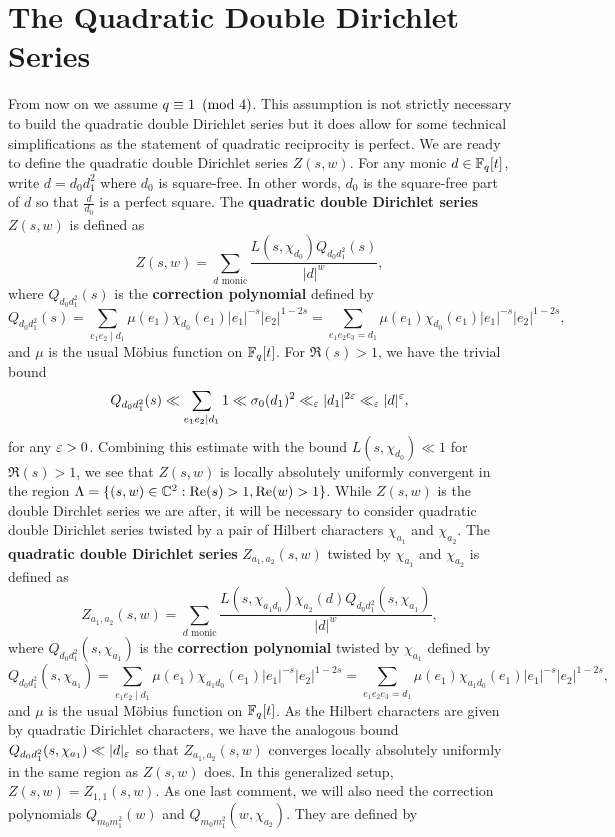 \documentclass[12pt,reqno,oneside]{amsart}
\begin{document}
\section{The Quadratic Double Dirichlet Series}
    From now on we assume $q \equiv 1 \ \left(\text{mod }4\right)$. This assumption is not strictly necessary to build the quadratic double Dirichlet series but it does allow for some technical simplifications as the statement of quadratic reciprocity is perfect. We are ready to define the quadratic double Dirichlet series $Z(s,w)$. For any monic $d \in \mathbb{F}_{q}[t]$, write $d = d_{0}d_{1}^{2}$ where $d_{0}$ is square-free. In other words, $d_{0}$ is the square-free part of $d$ so that $\frac{d}{d_{0}}$ is a perfect square. The \textbf{quadratic double Dirichlet series} $Z(s,w)$ is defined as
    \[
        Z(s,w) = \sum_{\text{$d$ monic}}\frac{L(s,\chi_{d_{0}})Q_{d_{0}d_{1}^{2}}(s)}{|d|^{w}},
    \]
    where $Q_{d_{0}d_{1}^{2}}(s)$ is the \textbf{correction polynomial} defined by
    \[
        Q_{d_{0}d_{1}^{2}}(s) = \sum_{e_{1}e_{2} \mid d_{1}}\mu(e_{1})\chi_{d_{0}}(e_{1})|e_{1}|^{-s}|e_{2}|^{1-2s} = \sum_{e_{1}e_{2}e_{3} = d_{1}}\mu(e_{1})\chi_{d_{0}}(e_{1})|e_{1}|^{-s}|e_{2}|^{1-2s},
    \]
    and $\mu$ is the usual M\"obius function on $\mathbb{F}_{q}[t]$. For $\Re(s) > 1$, we have the trivial bound
    \[
        Q_{d_{0}d_{1}^{2}}(s) \ll \sum_{e_{1}e_{2} \mid d_{1}}1 \ll \sigma_{0}(d_{1})^{2} \ll_{\varepsilon} |d_{1}|^{2\varepsilon} \ll_{\varepsilon} |d|^{\varepsilon},
    \]
    for any $\varepsilon > 0$. Combining this estimate with the bound $L(s,\chi_{d_{0}}) \ll 1$ for $\Re(s) > 1$, we see that $Z(s,w)$ is locally absolutely uniformly convergent in the region $\Lambda = \{(s,w) \in \mathbb{C}^{2}:\mathrm{Re}(s) > 1, \mathrm{Re}(w) > 1\}$. While $Z(s,w)$ is the double Dirchlet series we are after, it will be necessary to consider quadratic double Dirichlet series twisted by a pair of Hilbert characters $\chi_{a_{1}}$ and $\chi_{a_{2}}$. The \textbf{quadratic double Dirichlet series} $Z_{a_{1},a_{2}}(s,w)$ twisted by $\chi_{a_{1}}$ and $\chi_{a_{2}}$ is defined as
    \[
        Z_{a_{1},a_{2}}(s,w) = \sum_{\text{$d$ monic}}\frac{L(s,\chi_{a_{1}d_{0}})\chi_{a_{2}}(d)Q_{d_{0}d_{1}^{2}}(s,\chi_{a_{1}})}{|d|^{w}},
    \]
    where $Q_{d_{0}d_{1}^{2}}(s,\chi_{a_{1}})$ is the \textbf{correction polynomial} twisted by $\chi_{a_{1}}$ defined by
    \[
        Q_{d_{0}d_{1}^{2}}(s,\chi_{a_{1}}) = \sum_{e_{1}e_{2} \mid d_{1}}\mu(e_{1})\chi_{a_{1}d_{0}}(e_{1})|e_{1}|^{-s}|e_{2}|^{1-2s} = \sum_{e_{1}e_{2}e_{3} = d_{1}}\mu(e_{1})\chi_{a_{1}d_{0}}(e_{1})|e_{1}|^{-s}|e_{2}|^{1-2s},
    \]
    and $\mu$ is the usual M\"obius function on $\mathbb{F}_{q}[t]$. As the Hilbert characters are given by quadratic Dirichlet characters, we have the analogous bound $Q_{d_{0}d_{1}^{2}}(s,\chi_{a_{1}}) \ll |d|_{\varepsilon}$ so that $Z_{a_{1},a_{2}}(s,w)$ converges locally absolutely uniformly in the same region as $Z(s,w)$ does. In this generalized setup, $Z(s,w) = Z_{1,1}(s,w)$. As one last comment, we will also need the correction polynomials $Q_{m_{0}m_{1}^{2}}(w)$ and $Q_{m_{0}m_{1}^{2}}(w,\chi_{a_{2}})$. They are defined by
\end{document}

